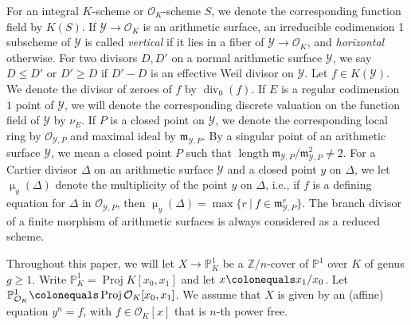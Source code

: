 \documentclass[12pt]{amsart}
\numberwithin{equation}{section}
\theoremstyle{definition}
\newcommand{\ol}[1]{\overline{#1}}
\newcommand{\mc}[1]{\mathcal{#1}}
\newcommand{\ints}{\mathbb Z}
\renewcommand{\O}{\mathcal{O}}
\renewcommand{\P}{\mathbb P}
\newcommand{\proj}{\mathbb P}
\DeclareMathOperator{\len}{length}
\DeclareMathOperator{\divi}{div}
\DeclareMathOperator{\Proj}{Proj}
\DeclareMathOperator{\mult}{\mu}
\begin{document}

For an integral $K$-scheme or $\mc{O}_K$-scheme $S$, we denote the corresponding function
field by $K(S)$. If $\mc{Y} \rightarrow \mc{O}_K$ is an arithmetic
surface, an irreducible codimension 1 subscheme of $\mc{Y}$ is called
\emph{vertical} if it lies in a fiber of $\mc{Y} \to \mc{O}_K$, and
\emph{horizontal} otherwise.  For two divisors $D,D'$ on a normal arithmetic surface $\mc{Y}$, we say $D \leq D'$ or $D' \geq D$ if $D'-D$ is an effective Weil divisor on $\mc{Y}$. Let $f \in K(\mathcal{Y})$. We denote the
divisor of zeroes of $f$ by $\divi_0(f)$. 
If $E$ is a regular codimension $1$ point of $\mc{Y}$, we will denote
the corresponding discrete valuation on the function field of $\mc{Y}$
by $\nu_E$. If $P$ is a closed point on $\mc{Y}$, we denote the
corresponding local ring by $\mc{O}_{\mc{Y},P}$ and maximal ideal by
$\mathfrak{m}_{\mc{Y},P}$. By a singular point of an arithmetic
surface $\mc{Y}$, we mean a closed point $P$ such that $\len
\mathfrak{m}_{\mc{Y},P}/\mathfrak{m}_{\mc{Y},P}^2 \neq 2$. For a
Cartier divisor $\Delta$ on an arithmetic surface $\mc{Y}$ and a
closed point $y$ on $\Delta$, we let $\mult_y(\Delta)$ denote the multiplicity of the point $y$ on $\Delta$, i.e., if $f$ is a defining equation for $\Delta$ in $\mc{O}_{\mc{Y},P}$, then $\mult_y(\Delta) = \max \{r \ | \  f \in \mathfrak{m}_{\mc{Y},P}^r \}$. The branch divisor of a finite morphism of arithmetic surfaces is always considered as a reduced scheme.


Throughout this paper, we will let $X \to \proj^1_K$ be a
$\ints/n$-cover of $\proj^1$ over $K$ of genus $g \geq 1$.  Write $\P^1_{K} =
\Proj K[x_0,x_1]$ and let $x \colonequals x_1/x_0$. Let $\P^1_{\O_K}
\colonequals \Proj \mc{O}_K[x_0,x_1]$. We assume that $X$ is given by an
(affine) equation $y^n = f$, with $f \in \mc{O}_K[x]$ that is $n$-th power free.  
\end{document}
